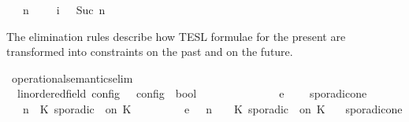 \begin{isabellebody}
\ \ {\isacartoucheopen}{\isacharparenleft}{\isasymGamma}{\isacharcomma}\ n\ {\isasymturnstile}\ {\isacharbrackleft}{\isacharbrackright}\ {\isasymtriangleright}\ {\isasymPhi}{\isacharparenright}\ {\isasymhookrightarrow}\isactrlsub i\ \ {\isacharparenleft}{\isasymGamma}{\isacharcomma}\ Suc\ n\ {\isasymturnstile}\ {\isasymPhi}\ {\isasymtriangleright}\ {\isacharbrackleft}{\isacharbrackright}{\isacharparenright}{\isacartoucheclose}%
\begin{isamarkuptext}%
The elimination rules describe how TESL formulae for the present are transformed 
  into constraints on the past and on the future.%
\end{isamarkuptext}\isamarkuptrue%
\isamarkupfalse%
\ operational{\isacharunderscore}semantics{\isacharunderscore}elim\isanewline
\ \ {\isacharcolon}{\isacharcolon}{\isacartoucheopen}{\isacharparenleft}{\isacharprime}{\isasymtau}{\isacharcolon}{\isacharcolon}linordered{\isacharunderscore}field{\isacharparenright}\ config\ {\isasymRightarrow}\ {\isacharprime}{\isasymtau}\ config\ {\isasymRightarrow}\ bool{\isacartoucheclose}\ \ \ \ \ \ \ \ \ \ \ \ \ \ {\isacharparenleft}{\isachardoublequoteopen}{\isacharunderscore}\ {\isasymhookrightarrow}\isactrlsub e\ {\isacharunderscore}{\isachardoublequoteclose}\ {}{}{\isacharparenright}\isanewline
{}\isanewline
\ \ sporadic{\isacharunderscore}on{\isacharunderscore}e{}{\isacharcolon}\isanewline
%
\isanewline
\ \ {\isacartoucheopen}{\isacharparenleft}{\isasymGamma}{\isacharcomma}\ n\ {\isasymturnstile}\ {\isacharparenleft}{\isacharparenleft}K\ sporadic\ {\isasymtau}\ on\ K\ {\isacharhash}\ {\isasymPsi}{\isacharparenright}\ {\isasymtriangleright}\ {\isasymPhi}{\isacharparenright}\isanewline
\ \ \ \ \ {\isasymhookrightarrow}\isactrlsub e\ \ {\isacharparenleft}{\isasymGamma}{\isacharcomma}\ n\ {\isasymturnstile}\ {\isasymPsi}\ {\isasymtriangleright}\ {\isacharparenleft}{\isacharparenleft}K\ sporadic\ {\isasymtau}\ on\ K\ {\isacharhash}\ {\isasymPhi}{\isacharparenright}{\isacharparenright}{\isacartoucheclose}\isanewline
{\isacharbar}\ sporadic{\isacharunderscore}on{\isacharunderscore}e{}{\isacharcolon}\isanewline
%
\end{isabellebody}
